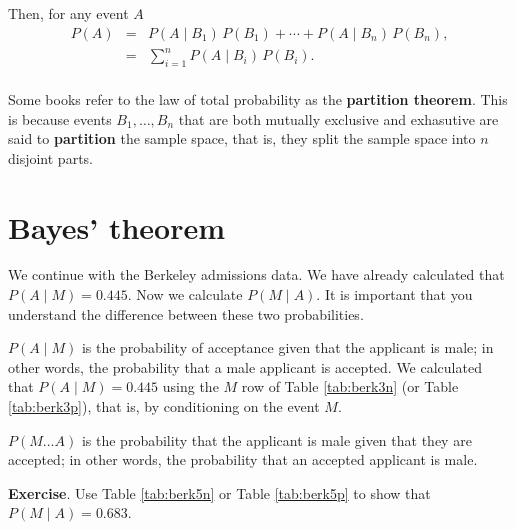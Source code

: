 \documentclass[
  british,
]{book}
\begin{document}
Then, for any event \(A\)
\begin{eqnarray}
P(A) &=& P(A \mid B_1)\,P(B_1) + \cdots + P(A \mid B_n)\,P(B_n), \\
     &=& \displaystyle\sum_{i=1}^n P(A \mid B_i)\,P(B_i). \\
\end{eqnarray}

Some books refer to the law of total probability as the \textbf{partition theorem}. This is because events \(B_1, \ldots, B_n\) that are both mutually exclusive and exhasutive are said to \textbf{partition} the sample space, that is, they split the sample space into \(n\) disjoint parts.

\hypertarget{bayes-theorem}{%
\section{Bayes' theorem}\label{bayes-theorem}}

We continue with the Berkeley admissions data. We have already calculated that \(P(A \mid M) = 0.445\). Now we calculate \(P(M \mid A)\). It is important that you understand the difference between these two probabilities.

\(P(A \mid M)\) is the probability of acceptance given that the applicant is male; in other words, the probability that a male applicant is accepted. We calculated that \(P(A \mid M)=0.445\) using the \(M\) row of Table \ref{tab:berk3n} (or Table \ref{tab:berk3p}), that is, by conditioning on the event \(M\).

\(P(M \ldots A)\) is the probability that the applicant is male given that they are accepted; in other words, the probability that an accepted applicant is male.

\textbf{Exercise}. Use Table \ref{tab:berk5n} or Table \ref{tab:berk5p} to show that \(P(M \mid A) = 0.683\).

 
  \providecommand{\huxb}[2]{\arrayrulecolor[RGB]{#1}\global\arrayrulewidth=#2pt}
  \providecommand{\huxvb}[2]{\color[RGB]{#1}\vrule width #2pt}
  \providecommand{\huxtpad}[1]{\rule{0pt}{#1}}
  \providecommand{\huxbpad}[1]{\rule[-#1]{0pt}{#1}}
\end{document}
